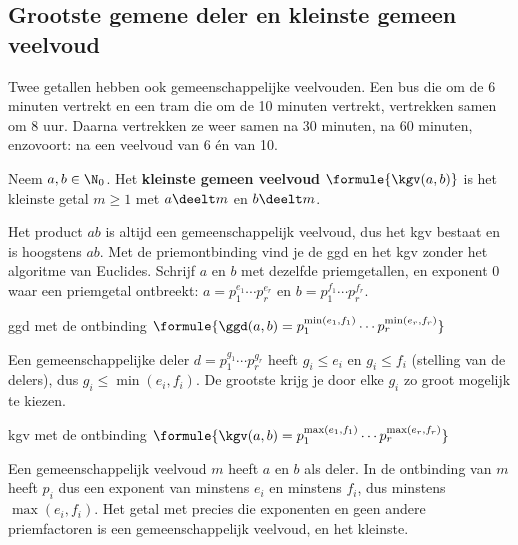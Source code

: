 \begin{oefeningen}
\end{oefeningen}

\subsection{Grootste gemene deler en kleinste gemeen veelvoud}

Twee getallen hebben ook gemeenschappelijke veelvouden. Een bus die om de 6 minuten vertrekt en een tram die om de 10 minuten vertrekt, vertrekken samen om 8 uur. Daarna vertrekken ze weer samen na 30 minuten, na 60 minuten, enzovoort: na een veelvoud van 6 én van 10.

\begin{theorie}
Neem $a, b \in \N_0$. Het \textbf{\textcolor{accent}{kleinste gemeen veelvoud}} $\formule{\kgv(a, b)}$ is het kleinste getal $m \geqslant 1$ met $a \deelt m$ en $b \deelt m$.
\end{theorie}

Het product $ab$ is altijd een gemeenschappelijk veelvoud, dus het kgv bestaat en is hoogstens $ab$. Met de priemontbinding vind je de ggd en het kgv zonder het algoritme van Euclides. Schrijf $a$ en $b$ met dezelfde priemgetallen, en exponent 0 waar een priemgetal ontbreekt: $a = p_1^{e_1} \cdots p_r^{e_r}$ en $b = p_1^{f_1} \cdots p_r^{f_r}$.

\begin{theorie}
\begin{stelling}{ggd met de ontbinding}
\qquad $\formule{\ggd(a, b) = p_1^{\min(e_1, f_1)} \cdots p_r^{\min(e_r, f_r)}}$
\end{stelling}

\begin{bewijs}
Een gemeenschappelijke deler $d = p_1^{g_1} \cdots p_r^{g_r}$ heeft $g_i \leqslant e_i$ en $g_i \leqslant f_i$ (stelling van de delers), dus $g_i \leqslant \min(e_i, f_i)$. De grootste krijg je door elke $g_i$ zo groot mogelijk te kiezen.
\end{bewijs}
\end{theorie}

\begin{theorie}
\begin{stelling}{kgv met de ontbinding}
\qquad $\formule{\kgv(a, b) = p_1^{\max(e_1, f_1)} \cdots p_r^{\max(e_r, f_r)}}$
\end{stelling}

\begin{bewijs}
Een gemeenschappelijk veelvoud $m$ heeft $a$ en $b$ als deler. In de ontbinding van $m$ heeft $p_i$ dus een exponent van minstens $e_i$ en minstens $f_i$, dus minstens $\max(e_i, f_i)$. Het getal met precies die exponenten en geen andere priemfactoren is een gemeenschappelijk veelvoud, en het kleinste.
\end{bewijs}
\end{theorie}


